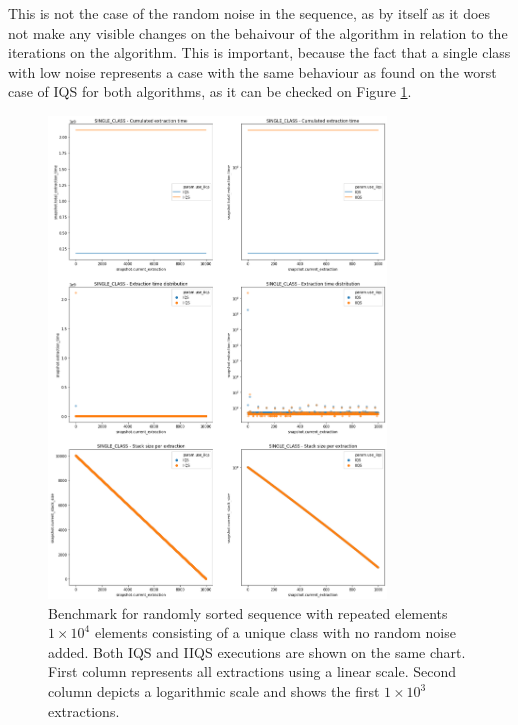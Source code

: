 This is not the case of the random noise in the sequence, as by itself as it does not make any visible changes on the behaivour of the algorithm in relation to the iterations on the algorithm. This is important, because the fact that a single class with low noise represents a case with the same behaviour as found on the worst case of IQS for both algorithms, as it can be checked on Figure \ref{FIG:BENCHMARK_04_SINGLE_CLASS}. 


\begin{figure}[!ht]
    \centering
    \includegraphics[width=0.8\textwidth]{./fragments/04_experimental_execution/images/01_basebenchmark_04_single_class.png}
    \caption{Benchmark for randomly sorted sequence with repeated elements $1\times10^4$ elements consisting of a unique class with no random noise added. Both IQS and IIQS executions are shown on the same chart. First column represents all extractions using a linear scale. Second column depicts a logarithmic scale and shows the first $1\times10^3$ extractions.}
    \label{FIG:BENCHMARK_04_SINGLE_CLASS}
\end{figure}

\FloatBarrier